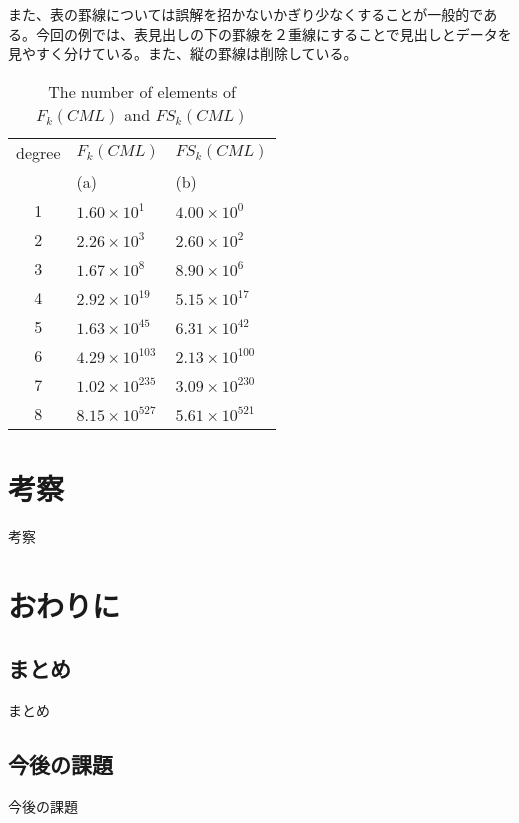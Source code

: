 \documentclass[12pt,epsf]{jreport}
\begin{document}
また、表の罫線については誤解を招かないかぎり少なくすることが一般的である。今回の例では、表見出しの下の罫線を２重線にすることで見出しとデータを見やすく分けている。また、縦の罫線は削除している。
 
 \begin{table}[tb]
\begin{center}
\caption{The number of elements of $F_{k}(CML)$ and $FS_{k}(CML)$}
\label{tab:num_of_schemata_satisfied_srp}
 \begin{tabular}{c l l}
  \hline
 degree & $F_{k}(CML)$ &$FS_{k}(CML)$ \\
    & (a)&  (b)\\ 
  \hline
  \hline
  1 &  $1.60 \times 10^{1}$ & $4.00 \times 10^{0}$\\
  2 & $2.26 \times 10^{3}$ & $2.60 \times 10^{2}$  \\
  3 & $1.67 \times 10^{8}$ & $8.90 \times 10^{6}$\\
  4 & $2.92 \times 10^{19}$ & $5.15 \times 10^{17}$\\
  5 & $1.63 \times 10^{45}$ & $6.31 \times 10^{42}$\\
  6 & $4.29 \times 10^{103}$ & $2.13 \times 10^{100}$\\
  7 & $1.02 \times 10^{235}$ & $3.09 \times 10^{230}$\\
  8 & $8.15 \times 10^{527}$ & $5.61 \times 10^{521}$\\ 
  \hline
 \end{tabular}
\end{center}
\end{table}




\chapter{考察}
考察

\chapter{おわりに}
 \section{まとめ}
 まとめ

 \section{今後の課題}
 今後の課題


\end{document}
